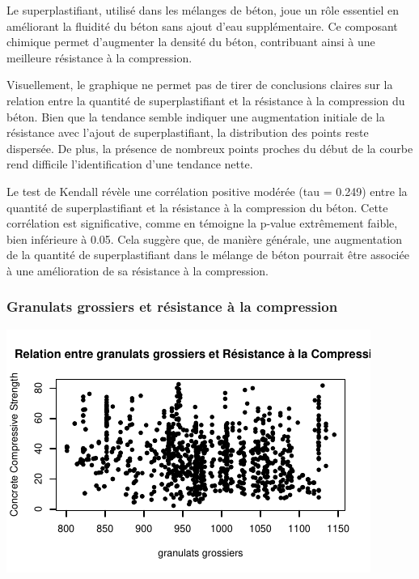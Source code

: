 \documentclass[
  12pt,
]{article}
\begin{document}
Le superplastifiant, utilisé dans les mélanges de béton, joue un rôle
essentiel en améliorant la fluidité du béton sans ajout d'eau
supplémentaire. Ce composant chimique permet d'augmenter la densité du
béton, contribuant ainsi à une meilleure résistance à la compression.

Visuellement, le graphique ne permet pas de tirer de conclusions claires
sur la relation entre la quantité de superplastifiant et la résistance à
la compression du béton. Bien que la tendance semble indiquer une
augmentation initiale de la résistance avec l'ajout de superplastifiant,
la distribution des points reste dispersée. De plus, la présence de
nombreux points proches du début de la courbe rend difficile
l'identification d'une tendance nette.

Le test de Kendall révèle une corrélation positive modérée (tau = 0.249)
entre la quantité de superplastifiant et la résistance à la compression
du béton. Cette corrélation est significative, comme en témoigne la
p-value extrêmement faible, bien inférieure à 0.05. Cela suggère que, de
manière générale, une augmentation de la quantité de superplastifiant
dans le mélange de béton pourrait être associée à une amélioration de sa
résistance à la compression.

\subsubsection{Granulats grossiers et résistance à la
compression}\label{granulats-grossiers-et-ruxe9sistance-uxe0-la-compression}

\begin{center}\includegraphics{rmd_final_files/figure-latex/unnamed-chunk-22-1} \end{center}
\end{document}
